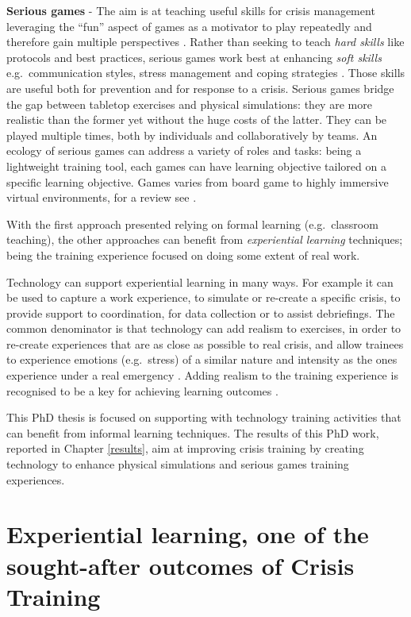 \textbf{Serious games} - The aim is at teaching useful skills for crisis
management leveraging the ``fun'' aspect of games as a motivator to play
repeatedly and therefore gain multiple perspectives
\autocite{DiLoreto:2012bj}. Rather than seeking to teach \emph{hard
skills} like protocols and best practices, serious games work best at
enhancing \emph{soft skills} e.g.~communication styles, stress
management and coping strategies \autocite{Sagun:2009ks}. Those skills
are useful both for prevention and for response to a crisis. Serious
games bridge the gap between tabletop exercises and physical
simulations: they are more realistic than the former yet without the
huge costs of the latter. They can be played multiple times, both by
individuals and collaboratively by teams. An ecology of serious games
can address a variety of roles and tasks: being a lightweight training
tool, each games can have learning objective tailored on a specific
learning objective. Games varies from board game to highly immersive
virtual environments, for a review see \autocite{DiLoreto:2012bj}.

With the first approach presented relying on formal learning
(e.g.~classroom teaching), the other approaches can benefit from
\emph{experiential learning} \autocite{kolb1984organizational}
techniques; being the training experience focused on doing some extent
of real work.

Technology can support experiential learning in many ways. For example
it can be used to capture a work experience, to simulate or re-create a
specific crisis, to provide support to coordination, for data collection
or to assist debriefings. The common denominator is that technology can
add realism to exercises, in order to re-create experiences that are as
close as possible to real crisis, and allow trainees to experience
emotions (e.g.~stress) of a similar nature and intensity as the ones
experience under a real emergency \autocite{MacKinnon:2012wz}. Adding
realism to the training experience is recognised to be a key for
achieving learning outcomes \autocite{Asproth:2013vs}.

This PhD thesis is focused on supporting with technology training
activities that can benefit from informal learning techniques. The
results of this PhD work, reported in Chapter \ref{results}, aim at
improving crisis training by creating technology to enhance physical
simulations and serious games training experiences.

\section{Experiential learning, one of the sought-after outcomes of
Crisis
Training}\label{experiential-learning-one-of-the-sought-after-outcomes-of-crisis-training}


